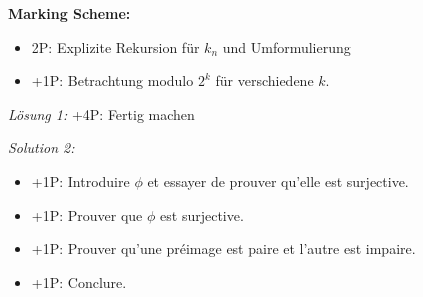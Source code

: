\documentclass[language=german,style=solution]{smo}
\begin{document}
\begin{enumerate}
\textbf{Marking Scheme:}
\begin{itemize}
	\item 2P: Explizite Rekursion für $k_n$ und Umformulierung
	\item +1P: Betrachtung modulo $2^k$ für verschiedene $k$.
\end{itemize}

\textit{Lösung 1:}
+4P: Fertig machen

\textit{Solution 2:}
\begin{itemize}
	\item +1P: Introduire $\phi$ et essayer de prouver qu'elle est surjective.
	\item +1P: Prouver que $\phi$ est surjective.
	\item +1P: Prouver qu'une préimage est paire et l'autre est impaire.
	\item +1P: Conclure. 
\end{itemize}



\end{enumerate}
\end{document}
